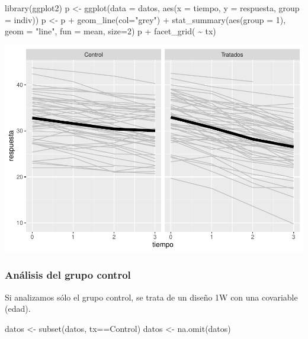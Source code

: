 \documentclass[
]{book}
\newenvironment{Shaded}{\begin{snugshade}}{\end{snugshade}}
\newcommand{\AttributeTok}[1]{\textcolor[rgb]{0.77,0.63,0.00}{#1}}
\newcommand{\DecValTok}[1]{\textcolor[rgb]{0.00,0.00,0.81}{#1}}
\newcommand{\FunctionTok}[1]{\textcolor[rgb]{0.00,0.00,0.00}{#1}}
\newcommand{\NormalTok}[1]{#1}
\newcommand{\OtherTok}[1]{\textcolor[rgb]{0.56,0.35,0.01}{#1}}
\newcommand{\SpecialCharTok}[1]{\textcolor[rgb]{0.00,0.00,0.00}{#1}}
\newcommand{\StringTok}[1]{\textcolor[rgb]{0.31,0.60,0.02}{#1}}
\begin{document}
\begin{Shaded}
\begin{Highlighting}[]
\FunctionTok{library}\NormalTok{(ggplot2)}
\NormalTok{p }\OtherTok{\textless{}{-}} \FunctionTok{ggplot}\NormalTok{(}\AttributeTok{data =}\NormalTok{ datos, }\FunctionTok{aes}\NormalTok{(}\AttributeTok{x =}\NormalTok{ tiempo, }\AttributeTok{y =}\NormalTok{ respuesta, }\AttributeTok{group =}\NormalTok{ indiv))}
\NormalTok{p }\OtherTok{\textless{}{-}}\NormalTok{ p }\SpecialCharTok{+} \FunctionTok{geom\_line}\NormalTok{(}\AttributeTok{col=}\StringTok{"grey"}\NormalTok{) }\SpecialCharTok{+} \FunctionTok{stat\_summary}\NormalTok{(}\FunctionTok{aes}\NormalTok{(}\AttributeTok{group =} \DecValTok{1}\NormalTok{),}
    \AttributeTok{geom =} \StringTok{"line"}\NormalTok{, }\AttributeTok{fun =}\NormalTok{ mean, }\AttributeTok{size=}\DecValTok{2}\NormalTok{)}
\NormalTok{p }\SpecialCharTok{+} \FunctionTok{facet\_grid}\NormalTok{( }\SpecialCharTok{\textasciitilde{}}\NormalTok{ tx)}
\end{Highlighting}
\end{Shaded}

\includegraphics{fig_out/unnamed-chunk-117-1.pdf}

\hypertarget{anuxe1lisis-del-grupo-control}{%
\subsubsection{Análisis del grupo control}\label{anuxe1lisis-del-grupo-control}}

Si analizamos sólo el grupo control, se trata de un diseño 1W con una covariable (edad).

\begin{Shaded}
\begin{Highlighting}[]
\NormalTok{datos }\OtherTok{\textless{}{-}} \FunctionTok{subset}\NormalTok{(datos, tx}\SpecialCharTok{==}\StringTok{\textquotesingle{}Control\textquotesingle{}}\NormalTok{)}
\NormalTok{datos }\OtherTok{\textless{}{-}} \FunctionTok{na.omit}\NormalTok{(datos)}
\end{Highlighting}
\end{Shaded}
\end{document}
